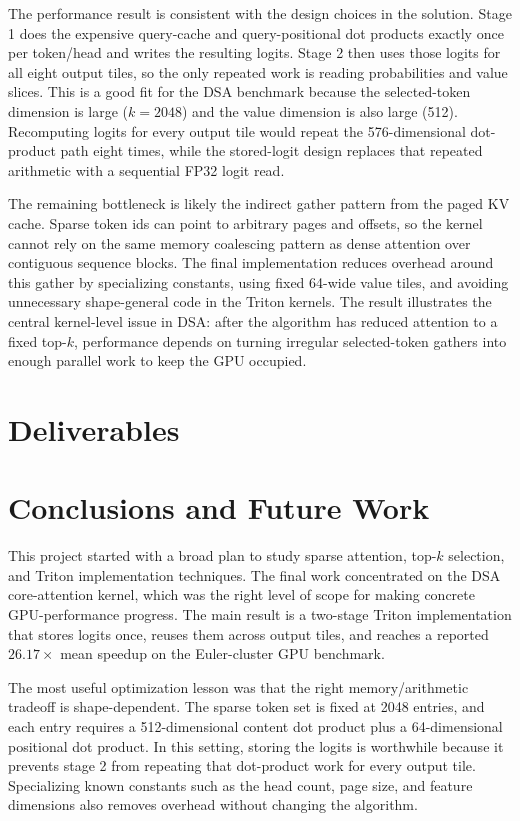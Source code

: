 \documentclass{article}
\begin{document}
The performance result is consistent with the design choices in the solution. Stage 1
does the expensive query-cache and query-positional dot products exactly once per
token/head and writes the resulting logits. Stage 2 then uses those logits for all eight
output tiles, so the only repeated work is reading probabilities and value slices. This
is a good fit for the DSA benchmark because the selected-token dimension is large
($k=2048$) and the value dimension is also large (512). Recomputing logits for every
output tile would repeat the 576-dimensional dot-product path eight times, while the
stored-logit design replaces that repeated arithmetic with a sequential FP32 logit read.

The remaining bottleneck is likely the indirect gather pattern from the paged KV cache.
Sparse token ids can point to arbitrary pages and offsets, so the kernel cannot rely on
the same memory coalescing pattern as dense attention over contiguous sequence blocks.
The final implementation reduces overhead around this gather by specializing constants,
using fixed 64-wide value tiles, and avoiding unnecessary shape-general code in the
Triton kernels. The result illustrates the central kernel-level issue in DSA: after the
algorithm has reduced attention to a fixed top-$k$, performance depends on turning
irregular selected-token gathers into enough parallel work to keep the GPU occupied.

\section{Deliverables}

\section{Conclusions and Future Work}

This project started with a broad plan to study sparse attention, top-$k$ selection, and
Triton implementation techniques. The final work concentrated on the DSA core-attention
kernel, which was the right level of scope for making concrete GPU-performance progress.
The main result is a two-stage Triton implementation that stores logits once, reuses
them across output tiles, and reaches a reported $26.17\times$ mean speedup on the
Euler-cluster GPU benchmark.

The most useful optimization lesson was that the right memory/arithmetic tradeoff is
shape-dependent. The sparse token set is fixed at 2048 entries, and each entry requires
a 512-dimensional content dot product plus a 64-dimensional positional dot product. In
this setting, storing the logits is worthwhile because it prevents stage 2 from repeating
that dot-product work for every output tile. Specializing known constants such as the
head count, page size, and feature dimensions also removes overhead without changing the
algorithm.
\end{document}
